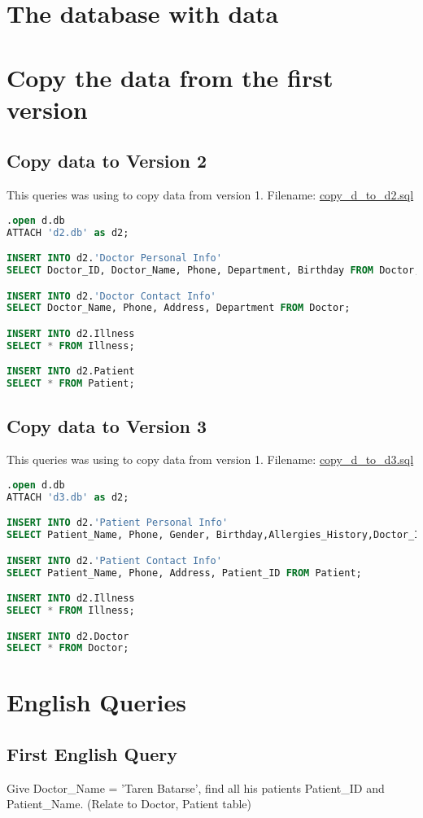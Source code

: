 \documentclass[12pt,arial]{article}
\begin{document}
\section{The database with data}


\section{Copy the data from the first version}
\subsection{Copy data to Version 2}
This queries was using to copy data from version 1.
Filename: \url{copy_d_to_d2.sql}
\begin{lstlisting}[language=SQL]
.open d.db
ATTACH 'd2.db' as d2;

INSERT INTO d2.'Doctor Personal Info'
SELECT Doctor_ID, Doctor_Name, Phone, Department, Birthday FROM Doctor;

INSERT INTO d2.'Doctor Contact Info'
SELECT Doctor_Name, Phone, Address, Department FROM Doctor;

INSERT INTO d2.Illness
SELECT * FROM Illness;

INSERT INTO d2.Patient
SELECT * FROM Patient;
\end{lstlisting}
\subsection{Copy data to Version 3}
This queries was using to copy data from version 1.
Filename: \url{copy_d_to_d3.sql}
\begin{lstlisting}[language=SQL]
.open d.db
ATTACH 'd3.db' as d2;

INSERT INTO d2.'Patient Personal Info'
SELECT Patient_Name, Phone, Gender, Birthday,Allergies_History,Doctor_ID,Illness_ID FROM Patient;

INSERT INTO d2.'Patient Contact Info'
SELECT Patient_Name, Phone, Address, Patient_ID FROM Patient;

INSERT INTO d2.Illness
SELECT * FROM Illness;

INSERT INTO d2.Doctor
SELECT * FROM Doctor;
\end{lstlisting}


\section{English Queries}
\subsection{First English Query}
Give Doctor\_Name = 'Taren Batarse', find all his patients Patient\_ID and Patient\_Name.
(Relate to Doctor, Patient table)
\end{document}

